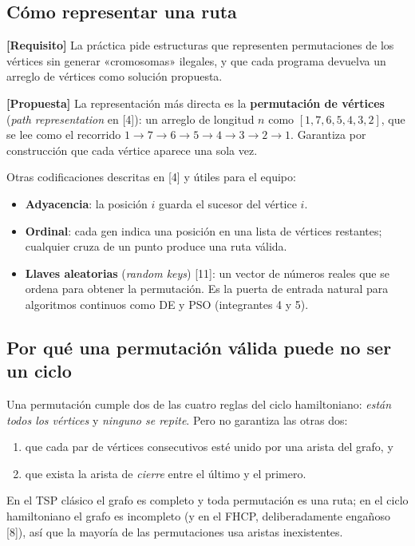 \documentclass[11pt,letterpaper]{article}
\theoremstyle{definition}
\newcommand{\req}{\textcolor{blue!60!black}{\textbf{[Requisito]}}}
\newcommand{\prop}{\textcolor{green!40!black}{\textbf{[Propuesta]}}}
\begin{document}
\subsection{Cómo representar una ruta}

\req{} La práctica pide estructuras que representen permutaciones de los vértices sin
generar «cromosomas» ilegales, y que cada programa devuelva un arreglo de vértices como
solución propuesta.

\prop{} La representación más directa es la \textbf{permutación de vértices}
(\emph{path representation} en [4]): un arreglo de longitud $n$ como
$[1,7,6,5,4,3,2]$, que se lee como el recorrido $1\to7\to6\to5\to4\to3\to2\to1$.
Garantiza por construcción que cada vértice aparece una sola vez.

Otras codificaciones descritas en [4] y útiles para el equipo:
\begin{itemize}[nosep]
  \item \textbf{Adyacencia}: la posición $i$ guarda el sucesor del vértice $i$.
  \item \textbf{Ordinal}: cada gen indica una posición en una lista de vértices restantes;
        cualquier cruza de un punto produce una ruta válida.
  \item \textbf{Llaves aleatorias} (\emph{random keys}) [11]: un vector de números reales que
        se ordena para obtener la permutación. Es la puerta de entrada natural para
        algoritmos continuos como DE y PSO (integrantes 4 y 5).
\end{itemize}

\subsection{Por qué una permutación válida puede no ser un ciclo}

Una permutación cumple dos de las cuatro reglas del ciclo hamiltoniano: \emph{están todos
los vértices} y \emph{ninguno se repite}. Pero no garantiza las otras dos:
\begin{enumerate}[nosep]
  \item que cada par de vértices consecutivos esté unido por una arista del grafo, y
  \item que exista la arista de \emph{cierre} entre el último y el primero.
\end{enumerate}
En el TSP clásico el grafo es completo y toda permutación es una ruta; en el ciclo
hamiltoniano el grafo es incompleto (y en el FHCP, deliberadamente engañoso [8]), así que la
mayoría de las permutaciones usa aristas inexistentes.
\end{document}
